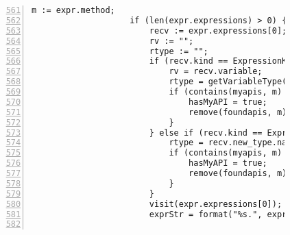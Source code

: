 \begin{figure}[ht!]
\begin{lstlisting}[numbers=left, tabsize=4, escapechar=@, caption={API Usage Mining Analysis},label={lst:aun-code},  firstline = 561, firstnumber = 561, lastline = 621]
                    m := expr.method;
                    if (len(expr.expressions) > 0) {
                        recv := expr.expressions[0];  
                        rv := ""; 
                        rtype := "";
                        if (recv.kind == ExpressionKind.VARACCESS) {
                            rv = recv.variable;
                            rtype = getVariableType(rv, true);
                            if (contains(myapis, m) && rtype != "") {
                                hasMyAPI = true;
                                remove(foundapis, m);
                            }
                        } else if (recv.kind == ExpressionKind.NEW) {
                            rtype = recv.new_type.name;
                            if (contains(myapis, m) && isAPIConstructor(recv.new_type.name)) {
                                hasMyAPI = true;    
                                remove(foundapis, m);
                            }
                        }
                        visit(expr.expressions[0]);
                        exprStr = format("%s.", exprStr);
                        

\end{lstlisting}
\end{figure}
